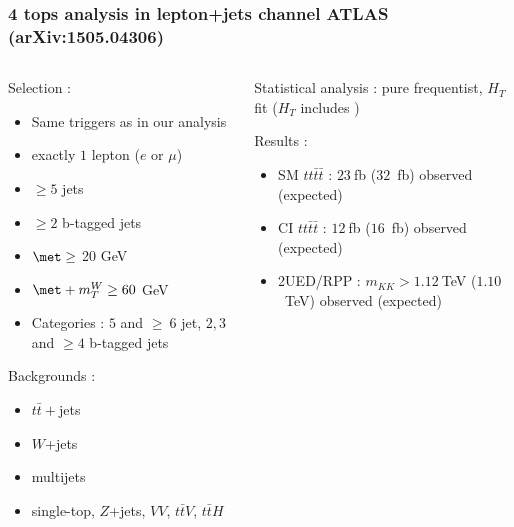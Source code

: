 \begin{frame}
\frametitle{4 tops analysis in lepton+jets channel ATLAS (arXiv:1505.04306)}

\begin{columns}
\begin{column}{0.6\textwidth}
\begin{maliste}
\item Selection :
\begin{itemize}
\item Same triggers as in our analysis
\item exactly $1$ lepton ($e$ or $\mu$)
\item $\geq 5$ jets
\item $\geq 2$ b-tagged jets 
\item $\met\geq$ 20 GeV
\item $\met + m_T^W \geq 60$ GeV
\item Categories : $5$ and $\geq~6$ jet, $2,3$ and $\geq 4$ b-tagged jets
\end{itemize}
\vspace*{0.2cm}
\item Backgrounds :
\begin{itemize}
\item $t\bar{t}+$jets
\item $W$+jets
\item multijets
\item single-top, $Z$+jets, $VV$, $t\bar{t}V$, $t\bar{t}H$
\end{itemize}
\end{maliste}
\end{column}
\begin{column}{0.5\textwidth}
\begin{maliste}
\item Statistical analysis : pure frequentist, $H_T$ fit ($H_T$ includes \met)
\vspace*{0.2cm}
\item Results : 
\begin{itemize}
\item SM $tt\bar{t}\bar{t}$ : $23~$fb ($32$~fb) observed (expected)
\item CI $tt\bar{t}\bar{t}$ : $12~$fb ($16$~fb) observed (expected)
\item 2UED/RPP : $m_{KK} > 1.12~$TeV ($1.10$~TeV) observed (expected)
\end{itemize}
\end{maliste}
\end{column}
\end{columns}
\end{frame}

